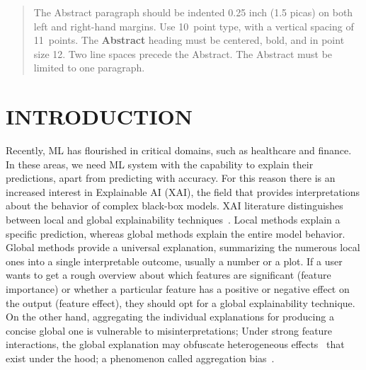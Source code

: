 \documentclass[twoside]{article}
\begin{document}
%

%


\begin{abstract}
  The Abstract paragraph should be indented 0.25 inch (1.5 picas) on
  both left and right-hand margins. Use 10~point type, with a vertical
  spacing of 11~points. The \textbf{Abstract} heading must be centered,
  bold, and in point size 12. Two line spaces precede the
  Abstract. The Abstract must be limited to one paragraph.
\end{abstract}


\section{INTRODUCTION}

Recently, ML has flourished in critical domains, such as healthcare
and finance. In these areas, we need ML system with the capability to
explain their predictions, apart from predicting with accuracy. For
this reason there is an increased interest in Explainable AI (XAI),
the field that provides interpretations about the behavior of complex
black-box models. XAI literature distinguishes between local and
global explainability
techniques~\citep{Molnar2020interpretable}. Local methods explain a
specific prediction, whereas global methods explain the entire model
behavior. Global methods provide a universal explanation, summarizing
the numerous local ones into a single interpretable outcome, usually a
number or a plot. If a user wants to get a rough overview about which
features are significant (feature importance) or whether a particular
feature has a positive or negative effect on the output (feature
effect), they should opt for a global explainability technique. On
the other hand, aggregating the individual explanations for producing
a concise global one is vulnerable to misinterpretations; Under strong
feature interactions, the global explanation may obfuscate
heterogeneous effects~\citep{Herbinger2022repid} that exist under the
hood; a phenomenon called aggregation bias~\citep{mehrabi2021survey}.
\end{document}
